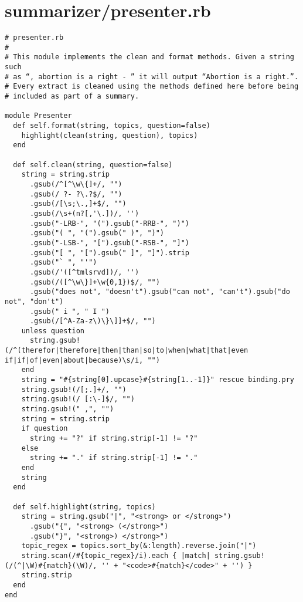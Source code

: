 \documentclass{article}
\begin{document}
\section*{summarizer/presenter.rb}
\begin{verbatim}
# presenter.rb
#
# This module implements the clean and format methods. Given a string such
# as “, abortion is a right - ” it will output “Abortion is a right.”.
# Every extract is cleaned using the methods defined here before being
# included as part of a summary.

module Presenter
  def self.format(string, topics, question=false)
    highlight(clean(string, question), topics)
  end

  def self.clean(string, question=false)
    string = string.strip
      .gsub(/^[^\w\{]+/, "")
      .gsub(/ ?- ?\.?$/, "")
      .gsub(/[\s;\.,]+$/, "")
      .gsub(/\s+(n?[,'\.])/, '')
      .gsub("-LRB-", "(").gsub("-RRB-", ")")
      .gsub("( ", "(").gsub(" )", ")")
      .gsub("-LSB-", "[").gsub("-RSB-", "]")
      .gsub("[ ", "[").gsub(" ]", "]").strip
      .gsub("` ", "'")
      .gsub(/'([^tmlsrvd])/, '')
      .gsub(/([^\w\}]+\w{0,1})$/, "")
      .gsub("does not", "doesn't").gsub("can not", "can't").gsub("do not", "don't")
      .gsub(" i ", " I ")
      .gsub(/[^A-Za-z\)\}\]]+$/, "")
    unless question
      string.gsub!(/^(therefor|therefore|then|than|so|to|when|what|that|even if|if|of|even|about|because)\s/i, "")
    end
    string = "#{string[0].upcase}#{string[1..-1]}" rescue binding.pry
    string.gsub!(/[;.]+/, "")
    string.gsub!(/ [:\-]$/, "")
    string.gsub!(" ,", "")
    string = string.strip
    if question
      string += "?" if string.strip[-1] != "?"
    else
      string += "." if string.strip[-1] != "."
    end
    string
  end

  def self.highlight(string, topics)
    string = string.gsub("|", "<strong> or </strong>")
      .gsub("{", "<strong> (</strong>")
      .gsub("}", "<strong>) </strong>")
    topic_regex = topics.sort_by(&:length).reverse.join("|")
    string.scan(/#{topic_regex}/i).each { |match| string.gsub!(/(^|\W)#{match}(\W)/, '' + "<code>#{match}</code>" + '') }
    string.strip
  end
end


\end{verbatim}
\pagebreak
\end{document}
